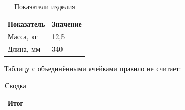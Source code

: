 \begin{table}
  \caption{Показатели изделия}
  \begin{tabular}{ll}
    \hline
    Показатель & Значение \\
    \hline
    Масса, кг & 12,5 \\
    Длина, мм & 340 \\
    \hline
  \end{tabular}
\end{table}

Таблицу с объединёнными ячейками правило не считает:

\begin{table}
  \caption{Сводка}
  \begin{tabular}{l}
    \hline
    \multicolumn{1}{c}{Итог} \\
    \hline
  \end{tabular}
\end{table}
